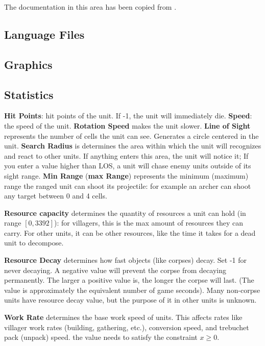 \begin{appendices}
    The documentation in this area has been copied from \cite{agewiki:2014}.

    \subsection{Language Files}

    \subsection{Graphics}

    \subsection{Statistics}

    \textbf{Hit Points}: hit points of the unit. If -1, the unit will immediately die\cite{genie:hitpoints}. \textbf{Speed}: the speed of the unit. \textbf{Rotation Speed} makes the unit slower. \textbf{Line of Sight} represents the number of cells the unit can see. Generates a circle centered in the unit. \textbf{Search Radius} is determines the area within which the unit will recognizes and react to other units.  If anything enters this area, the unit will notice it; If you enter a value higher than LOS, a unit will chase enemy units outside of its sight range. \textbf{Min Range} (\textbf{max Range}) represents the minimum (maximum) range the ranged unit can shoot its projectile: for example an archer can shoot any target between 0 and 4 cells\cite{agewiki:2014}.

    \textbf{Resource capacity} determines the quantity of resources a unit can hold (in range $[0, 3392]$): for villagers, this is the max amount of resources they can carry. For other units, it can be other resources, like the time it takes for a dead unit to decompose\cite{agewiki:2014}.

    \textbf{Resource Decay} determines how fast objects (like corpses) decay. Set -1 for never decaying. A negative value will prevent the corpse from decaying permanently. The larger a positive value is, the longer the corpse will last. (The value is approximately the equivalent number of game seconds). Many non-corpse units have resource decay value, but the purpose of it in other units is unknown\cite{agewiki:2014}. 

    \textbf{Work Rate} determines the base work speed of units. This affects rates like villager work rates (building, gathering, etc.), conversion speed, and trebuchet pack (unpack) speed. the value needs to satisfy the constraint $x \geq 0$\cite{agewiki:2014}.


\end{appendices}
